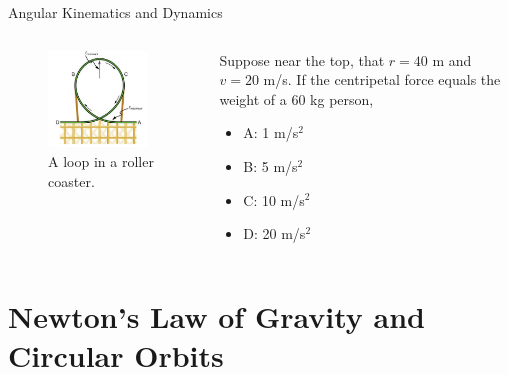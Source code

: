 \documentclass{beamer}
\begin{document}
\begin{frame}{Angular Kinematics and Dynamics}
\begin{columns}[T]
\begin{column}{0.5\textwidth}
\begin{figure}
\centering
\includegraphics[width=0.9\textwidth]{figures/loop.png}
\caption{\label{fig:loop1} A loop in a roller coaster.}
\end{figure}
\end{column}
\begin{column}{0.5\textwidth}
\small
Suppose near the top, that $r = 40$ m and $v = 20$ m/s.  If the centripetal force equals the weight of a 60 kg person, 
\begin{itemize}
\item A: 1 m/s$^2$
\item B: 5 m/s$^2$
\item C: 10 m/s$^2$
\item D: 20 m/s$^2$
\end{itemize}
\end{column}
\end{columns}
\end{frame}

\section{Newton's Law of Gravity and Circular Orbits}
\end{document}
